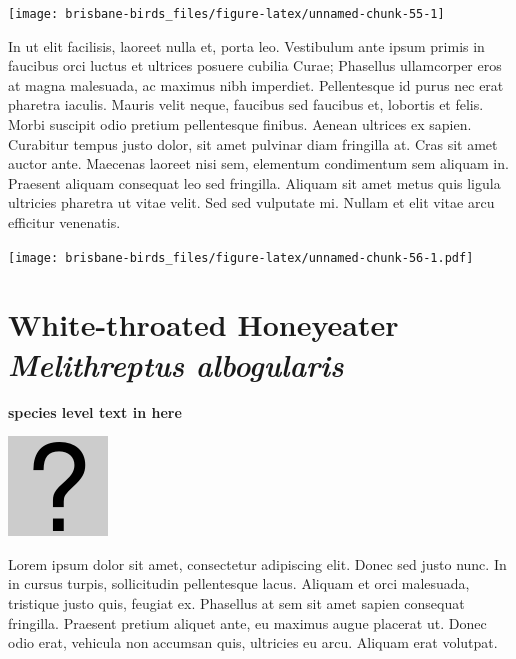 \documentclass[]{book}
\let\origfigure\figure
\let\endorigfigure\endfigure
\renewenvironment{figure}[1][2] {
  \expandafter\origfigure\expandafter[H]
} {
  \endorigfigure
}
\begin{document}
\begin{figure}
\texttt{[image: brisbane-birds\_files/figure-latex/unnamed-chunk-55-1]} \caption{insert figure caption}\label{fig:unnamed-chunk-55}
\end{figure}

In ut elit facilisis, laoreet nulla et, porta leo. Vestibulum ante ipsum
primis in faucibus orci luctus et ultrices posuere cubilia Curae;
Phasellus ullamcorper eros at magna malesuada, ac maximus nibh
imperdiet. Pellentesque id purus nec erat pharetra iaculis. Mauris velit
neque, faucibus sed faucibus et, lobortis et felis. Morbi suscipit odio
pretium pellentesque finibus. Aenean ultrices ex sapien. Curabitur
tempus justo dolor, sit amet pulvinar diam fringilla at. Cras sit amet
auctor ante. Maecenas laoreet nisi sem, elementum condimentum sem
aliquam in. Praesent aliquam consequat leo sed fringilla. Aliquam sit
amet metus quis ligula ultricies pharetra ut vitae velit. Sed sed
vulputate mi. Nullam et elit vitae arcu efficitur venenatis.

\begin{figure}
\centering
\texttt{[image: brisbane-birds\_files/figure-latex/unnamed-chunk-56-1.pdf]}
\caption{\label{fig:unnamed-chunk-56}insert figure caption}
\end{figure}

\section{\texorpdfstring{White-throated Honeyeater \emph{Melithreptus
albogularis}}{White-throated Honeyeater Melithreptus albogularis}}\label{white-throated-honeyeater-melithreptus-albogularis}

\textbf{species level text in here}

\begin{figure}
\centering
\includegraphics{assets/missing.png}
\caption{No image for species}
\end{figure}

Lorem ipsum dolor sit amet, consectetur adipiscing elit. Donec sed justo
nunc. In in cursus turpis, sollicitudin pellentesque lacus. Aliquam et
orci malesuada, tristique justo quis, feugiat ex. Phasellus at sem sit
amet sapien consequat fringilla. Praesent pretium aliquet ante, eu
maximus augue placerat ut. Donec odio erat, vehicula non accumsan quis,
ultricies eu arcu. Aliquam erat volutpat.
\end{document}
